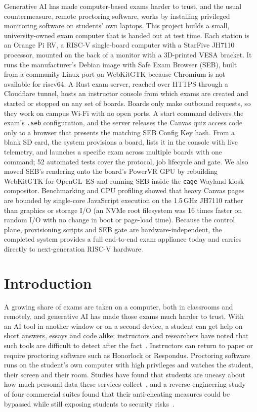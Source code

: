 \documentclass[11pt]{article}
\begin{document}
Generative AI has made computer-based exams harder to trust, and the usual countermeasure, remote proctoring software, works by installing privileged monitoring software on students' own laptops. This project builds a small, university-owned exam computer that is handed out at test time. Each station is an Orange Pi RV, a RISC-V single-board computer with a StarFive JH7110 processor, mounted on the back of a monitor with a 3D-printed VESA bracket. It runs the manufacturer's Debian image with Safe Exam Browser (SEB), built from a community Linux port on WebKitGTK because Chromium is not available for riscv64. A Rust exam server, reached over HTTPS through a Cloudflare tunnel, hosts an instructor console from which exams are created and started or stopped on any set of boards. Boards only make outbound requests, so they work on campus Wi-Fi with no open ports. A start command delivers the exam's \texttt{.seb} configuration, and the server releases the Canvas quiz access code only to a browser that presents the matching SEB Config Key hash. From a blank SD card, the system provisions a board, lists it in the console with live telemetry, and launches a specific exam across multiple boards with one command; 52 automated tests cover the protocol, job lifecycle and gate. We also moved SEB's rendering onto the board's PowerVR GPU by rebuilding WebKitGTK for OpenGL~ES and running SEB inside the \texttt{cage} Wayland kiosk compositor. Benchmarking and CPU profiling showed that heavy Canvas pages are bounded by single-core JavaScript execution on the 1.5\,GHz JH7110 rather than graphics or storage I/O (an NVMe root filesystem was 16 times faster on random I/O with no change in boot or page-load time). Because the control plane, provisioning scripts and SEB gate are hardware-independent, the completed system provides a full end-to-end exam appliance today and carries directly to next-generation RISC-V hardware.

\section{Introduction}

A growing share of exams are taken on a computer, both in classrooms and remotely, and generative AI has made those exams much harder to trust. With an AI tool in another window or on a second device, a student can get help on short answers, essays and code alike; instructors and researchers have noted that such tools are difficult to detect after the fact~\cite{cotton2024}. Instructors can return to paper or require proctoring software such as Honorlock or Respondus. Proctoring software runs on the student's own computer with high privileges and watches the student, their screen and their room. Studies have found that students are uneasy about how much personal data these services collect~\cite{balash2021}, and a reverse-engineering study of four commercial suites found that their anti-cheating measures could be bypassed while still exposing students to security risks~\cite{burgess2022}.
\end{document}
